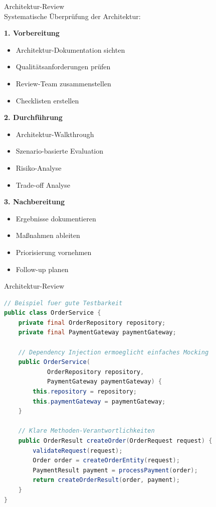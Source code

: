 \begin{KR}{Architektur-Review}\\
Systematische Überprüfung der Architektur:

\textbf{1. Vorbereitung}
\begin{itemize}
    \item Architektur-Dokumentation sichten
    \item Qualitätsanforderungen prüfen
    \item Review-Team zusammenstellen
    \item Checklisten erstellen
\end{itemize}

\textbf{2. Durchführung}
\begin{itemize}
    \item Architektur-Walkthrough
    \item Szenario-basierte Evaluation
    \item Risiko-Analyse
    \item Trade-off Analyse
\end{itemize}

\textbf{3. Nachbereitung}
\begin{itemize}
    \item Ergebnisse dokumentieren
    \item Maßnahmen ableiten
    \item Priorisierung vornehmen
    \item Follow-up planen
\end{itemize}
\end{KR}

\begin{example2}{Architektur-Review}\\

\begin{lstlisting}[language=Java, style=basesmol]
// Beispiel fuer gute Testbarkeit
public class OrderService {
    private final OrderRepository repository;
    private final PaymentGateway paymentGateway;
    
    // Dependency Injection ermoeglicht einfaches Mocking
    public OrderService(
            OrderRepository repository,
            PaymentGateway paymentGateway) {
        this.repository = repository;
        this.paymentGateway = paymentGateway;
    }
    
    // Klare Methoden-Verantwortlichkeiten
    public OrderResult createOrder(OrderRequest request) {
        validateRequest(request);
        Order order = createOrderEntity(request);
        PaymentResult payment = processPayment(order);
        return createOrderResult(order, payment);
    }
}
\end{lstlisting}
\end{example2}

